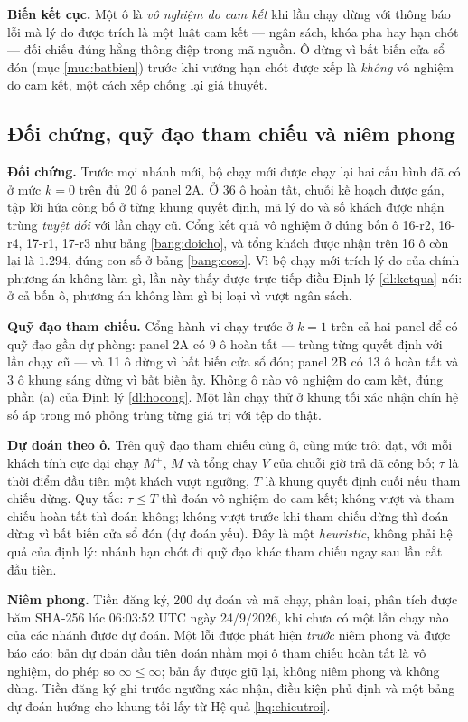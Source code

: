 \textbf{Biến kết cục.} Một ô là \emph{vô nghiệm do cam kết} khi lần chạy dừng với thông báo lỗi mà
lý do được trích là một luật cam kết --- ngân sách, khóa pha hay hạn chót --- đối chiếu đúng hằng
thông điệp trong mã nguồn. Ô dừng vì bất biến cửa sổ đón (mục \ref{muc:batbien}) trước khi vướng
hạn chót được xếp là \emph{không} vô nghiệm do cam kết, một cách xếp chống lại giả thuyết.

\subsection{Đối chứng, quỹ đạo tham chiếu và niêm phong}

\textbf{Đối chứng.} Trước mọi nhánh mới, bộ chạy mới được chạy lại hai cấu hình đã có ở mức $k = 0$
trên đủ 20 ô panel 2A. Ở 36 ô hoàn tất, chuỗi kế hoạch được gán, tập lời hứa công bố ở từng khung
quyết định, mã lý do và số khách được nhận trùng \emph{tuyệt đối} với lần chạy cũ. Cổng kết quả vô
nghiệm ở đúng bốn ô 16-r2, 16-r4, 17-r1, 17-r3 như bảng \ref{bang:doicho}, và tổng khách được nhận
trên 16 ô còn lại là $1.294$, đúng con số ở bảng \ref{bang:coso}. Vì bộ chạy mới trích lý do của
chính phương án không làm gì, lần này thấy được trực tiếp điều Định lý \ref{dl:ketqua} nói: ở cả bốn
ô, phương án không làm gì bị loại vì vượt ngân sách.

\textbf{Quỹ đạo tham chiếu.} Cổng hành vi chạy trước ở $k = 1$ trên cả hai panel để có quỹ đạo gần
dự phòng: panel 2A có 9 ô hoàn tất --- trùng từng quyết định với lần chạy cũ --- và 11 ô dừng vì bất
biến cửa sổ đón; panel 2B có 13 ô hoàn tất và 3 ô khung sáng dừng vì bất biến ấy. Không ô nào vô
nghiệm do cam kết, đúng phần (a) của Định lý \ref{dl:hocong}. Một lần chạy thử ở khung tối xác nhận
chín hệ số áp trong mô phỏng trùng từng giá trị với tệp đo thật.

\textbf{Dự đoán theo ô.} Trên quỹ đạo tham chiếu cùng ô, cùng mức trôi dạt, với mỗi khách tính cực
đại chạy $M^{+}$, $M$ và tổng chạy $V$ của chuỗi giờ trả đã công bố; $\tau$ là thời điểm đầu tiên một
khách vượt ngưỡng, $T$ là khung quyết định cuối nếu tham chiếu dừng. Quy tắc: $\tau \le T$ thì đoán
vô nghiệm do cam kết; không vượt và tham chiếu hoàn tất thì đoán không; không vượt trước khi tham
chiếu dừng thì đoán dừng vì bất biến cửa sổ đón (dự đoán yếu). Đây là một \emph{heuristic}, không
phải hệ quả của định lý: nhánh hạn chót đi quỹ đạo khác tham chiếu ngay sau lần cắt đầu tiên.

\textbf{Niêm phong.} Tiền đăng ký, 200 dự đoán và mã chạy, phân loại, phân tích được băm SHA-256 lúc
06:03:52 UTC ngày 24/9/2026, khi chưa có một lần chạy nào của các nhánh được dự đoán. Một lỗi được
phát hiện \emph{trước} niêm phong và được báo cáo: bản dự đoán đầu tiên đoán nhầm mọi ô tham chiếu
hoàn tất là vô nghiệm, do phép so $\infty \le \infty$; bản ấy được giữ lại, không niêm phong và không
dùng. Tiền đăng ký ghi trước ngưỡng xác nhận, điều kiện phủ định và một bảng dự đoán hướng cho khung
tối lấy từ Hệ quả \ref{hq:chieutroi}.
